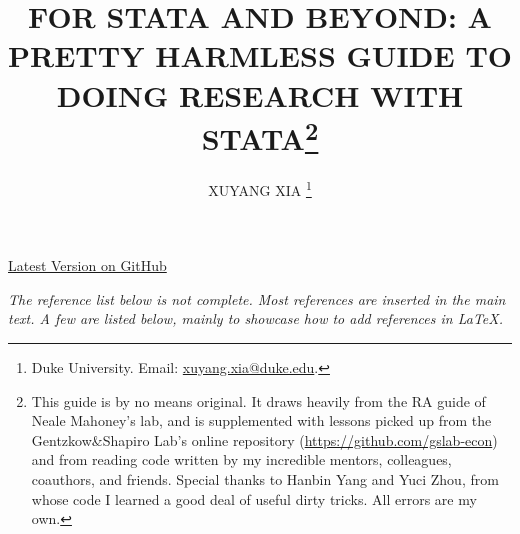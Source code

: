 
\usetikzlibrary{decorations.pathreplacing}
\usetikzlibrary{positioning}
\usetikzlibrary{arrows.meta}




\title{ \vspace{-0.4in} \textbf{\uppercase{\LARGE{For Stata and Beyond: A Pretty Harmless Guide to Doing Research with Stata}}}\thanks{This guide is by no means original. It draws heavily from the RA guide of Neale Mahoney’s lab, and is supplemented with lessons picked up from the Gentzkow{\&}Shapiro Lab’s online repository (\url{https://github.com/gslab-econ}) and from reading code written by my incredible mentors, colleagues, coauthors, and friends. Special thanks to Hanbin Yang and Yuci Zhou, from whose code I learned a good deal of useful dirty tricks. All errors are my own.}}

\author{
	\uppercase{Xuyang Xia} \thanks{Duke University. Email: \href{mailto:xuyang.xia@duke.edu}{xuyang.xia@duke.edu}.} 
}


\maketitle
\begin{center}
    \href{https://github.com/xxia1/Stata_XX/blob/main/For%20Stata%20and%20Beyond-%20A%20Pretty%20Harmless%20Guide%20to%20Doing%20Research%20with%20Stata.pdf}{Latest Version on GitHub}
\end{center}
\tableofcontents
\thispagestyle{empty} 
\setcounter{page}{0}
\vspace{-12pt}
% 

\clearpage





\newpage
\vspace{16pt}

\singlespacing 
\noindent\textit{The reference list below is not complete. Most references are inserted in the main text. A few are listed below, mainly to showcase how to add references in {\LaTeX.}}


\onehalfspacing

% 





